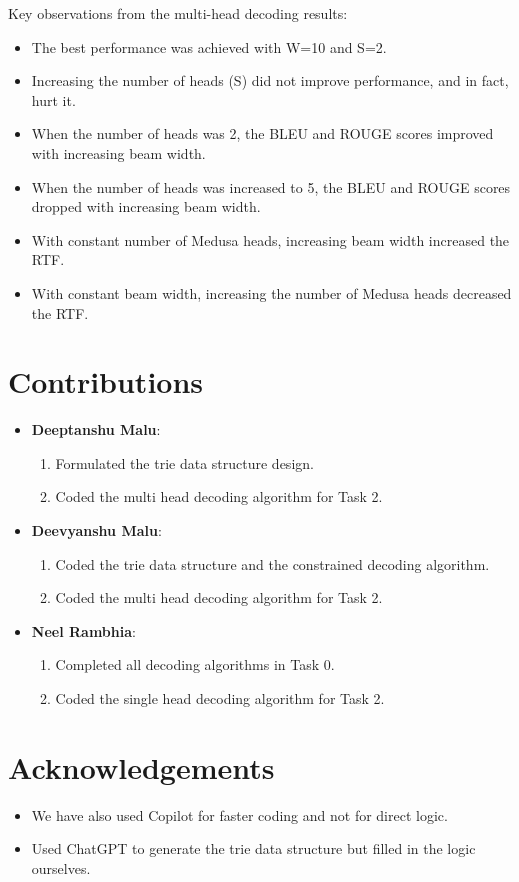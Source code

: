 \documentclass[11pt]{article}
\begin{document}
Key observations from the multi-head decoding results:
\begin{itemize}
    \item The best performance was achieved with W=10 and S=2.
    \item Increasing the number of heads (S) did not improve performance, and in fact, hurt it.
    \item When the number of heads was 2, the BLEU and ROUGE scores improved with increasing beam width.
    \item When the number of heads was increased to 5, the BLEU and ROUGE scores dropped with increasing beam width.
    \item With constant number of Medusa heads, increasing beam width increased the RTF.
    \item With constant beam width, increasing the number of Medusa heads decreased the RTF.
\end{itemize}

\section*{Contributions}

\begin{itemize}
    \item \textbf{Deeptanshu Malu}:
    \begin{enumerate}
        \item Formulated the trie data structure design.
        \item Coded the multi head decoding algorithm for Task 2.
    \end{enumerate}

    \item \textbf{Deevyanshu Malu}:
    \begin{enumerate}
        \item Coded the trie data structure and the constrained decoding algorithm.
        \item Coded the multi head decoding algorithm for Task 2.
    \end{enumerate}

    \item \textbf{Neel Rambhia}:
    \begin{enumerate}
        \item Completed all decoding algorithms in Task 0.
        \item Coded the single head decoding algorithm for Task 2.
    \end{enumerate}
\end{itemize}

\section*{Acknowledgements}

\begin{itemize}
    \item We have also used Copilot for faster coding and not for direct logic.
    \item Used ChatGPT to generate the trie data structure but filled in the logic ourselves.
\end{itemize}
\end{document}
